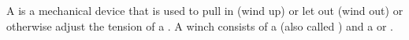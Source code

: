 \begin{module}[id=winch]

\begin{definition}
  A  is a mechanical device that is used to pull in (wind up) or let out (wind
  out) or otherwise adjust the tension of a . A winch consists of a
   (also called ) and a  or
  .
\end{definition}
\end{module}
